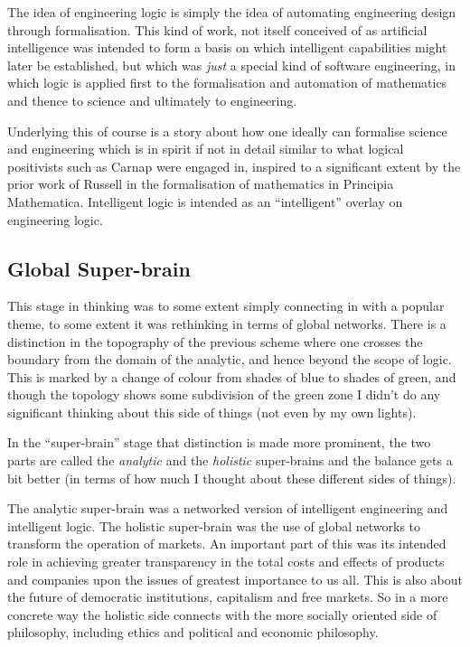 The idea of engineering logic is simply the idea of automating engineering design through formalisation.
This kind of work, not itself conceived of as artificial intelligence was intended to form a basis on which intelligent capabilities might later be established, but which was {\it just} a special kind of software engineering, in which logic is applied first to the formalisation and automation of mathematics and thence to science and ultimately to engineering.

Underlying this of course is a story about how one ideally can formalise science and engineering which is in spirit if not in detail similar to what logical positivists such as Carnap were engaged in, inspired to a significant extent by the prior work of Russell in the formalisation of mathematics in Principia Mathematica.
Intelligent logic is intended as an ``intelligent'' overlay on engineering logic.

\subsection{Global Super-brain}

This stage in thinking was to some extent simply connecting in with a popular theme, to some extent it was rethinking in terms of global networks.
There is a distinction in the topography of the previous scheme where one crosses the boundary from the domain of the analytic, and hence beyond the scope of logic.
This is marked by a change of colour from shades of blue to shades of green, and though the topology shows some subdivision of the green zone I didn't do any significant thinking about this side of things (not even by my own lights).

In the ``super-brain'' stage that distinction is made more prominent, the two parts are called the {\it analytic} and the {\it holistic} super-brains and the balance gets a bit better (in terms of how much I thought about these different sides of things).

The analytic super-brain was a networked version of intelligent engineering and intelligent logic.
The holistic super-brain was the use of global networks to transform the operation of markets.
An important part of this was its intended role in achieving greater transparency in the total costs and effects of products and companies upon the issues of greatest importance to us all.
This is also about the future of democratic institutions, capitalism and free markets.
So in a more concrete way the holistic side connects with the more socially oriented side of philosophy, including ethics and political and economic philosophy.

